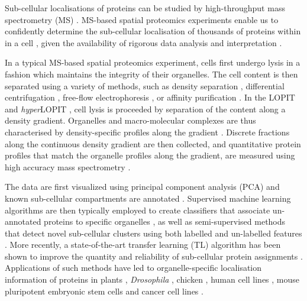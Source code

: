 \documentclass[12pt,english]{article}
\begin{document}
Sub-cellular localisations of proteins
can be studied by high-throughput mass spectrometry (MS)
\citep{Gatto:2010}. MS-based spatial proteomics experiments enable us
to confidently determine the sub-cellular localisation of thousands of
proteins within in a cell \citep{hyper}, given the availability of
rigorous data analysis and interpretation \citep{Gatto:2010}.

In a typical MS-based spatial proteomics experiment, cells first
undergo lysis in a fashion which maintains the integrity of their
organelles. The cell content is then separated using a variety of
methods, such as density separation \citep{Dunkley:2006,hyper},
differential centrifugation \citep{Itzhak:2016}, free-flow
electrophoresis \citep{Parsons:2014}, or affinity purification
\citep{Heard:2015}. In the LOPIT \citep{Dunkley:2004, Dunkley:2006,
  Sadowski:2006} and \textit{hyper}LOPIT \citep{Mulvey:2017}, cell
lysis is proceeded by separation of the content along a density
gradient. Organelles and macro-molecular complexes are thus
characterised by density-specific profiles along the gradient
\citep{DeDuve:1981}.  Discrete fractions along the continuous density
gradient are then collected, and quantitative protein profiles that
match the organelle profiles along the gradient, are measured using
high accuracy mass spectrometry \citep{Mulvey:2017}.

The data are first visualized using principal component
analysis (PCA) and known sub-cellular compartments are annotated
\citep{ghrepo}. Supervised machine learning algorithms are then typically
employed to create classifiers that associate un-annotated
proteins to specific organelles \citep{Gatto:2014b}, as well
as semi-supervised methods that detect novel sub-cellular
clusters using both labelled and un-labelled features
\citep{Breckels:2013}. More recently, a state-of-the-art
transfer learning (TL) algorithm has been shown to improve
the quantity and reliability of sub-cellular protein
assignments \citep{Breckels:2016}. Applications of such
methods have led to organelle-specific localisation
information of proteins in plants \citep{Dunkley:2006}, \textit{Drosophila}
\citep{Tan:2009}, chicken \citep{hall:2009}, human cell lines
\citep{Breckels:2013}, mouse pluripotent embryonic stem cells
\citep{hyper} and cancer cell lines \citep{Thul:2017}.
\end{document}
